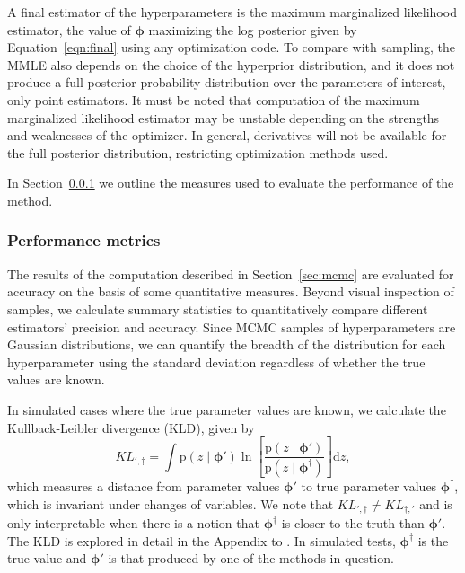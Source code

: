 \documentclass[iop]{emulateapj}
\newcommand{\Sect}[1]{Section~\ref{#1}}
\newcommand{\Eq}[1]{Equation~\ref{#1}}
\newcommand{\pr}[1]{\ensuremath{\mathrm{p}(#1)}}%
\newcommand{\gvn}{\mid}%
\newcommand{\integral}[2]{\ensuremath{\int #1 \mathrm{d} #2}}
\newcommand{\bvec}[1]{\ensuremath{\boldsymbol{#1}}}%
\newcommand{\ndphi}{\bvec{\phi}}
\begin{document}
A final estimator of the hyperparameters is the maximum marginalized likelihood estimator, the value of $\ndphi$ maximizing the log posterior given by \Eq{eqn:final} using any optimization code.  
To compare with sampling, the MMLE also depends on the choice of the hyperprior distribution, and it does not produce a full posterior probability distribution over the parameters of interest, only point estimators.  
It must be noted that computation of the maximum marginalized likelihood estimator may be unstable depending on the strengths and weaknesses of the optimizer.  
In general, derivatives will not be available for the full posterior distribution, restricting optimization methods used.

In \Sect{sec:diag} we outline the measures used to evaluate the performance of the method.

\subsubsection{Performance metrics}
\label{sec:diag}

The results of the computation described in \Sect{sec:mcmc} are evaluated for accuracy on the basis of some quantitative measures.  
Beyond visual inspection of samples, we calculate summary statistics to quantitatively compare different estimators' precision and accuracy.  
Since MCMC samples of hyperparameters are Gaussian distributions, we can quantify the breadth of the distribution for each hyperparameter using the standard deviation regardless of whether the true values are known.  

In simulated cases where the true parameter values are known, we calculate the Kullback-Leibler divergence (KLD), given by 
\begin{equation}
\label{eqn:kl}
KL_{',\ddagger} = \integral{\pr{z \gvn \ndphi'} \ln \left[ \frac{\pr{z \gvn \ndphi'}}{\pr{z \gvn \ndphi^{\dagger}}} \right]}{z} ,
\end{equation}
which measures a distance from parameter values $\ndphi'$ to true parameter values $\ndphi^{\dagger}$, which is invariant under changes of variables.  
We note that $KL_{',\dagger} \neq KL_{\dagger,'}$ and is only interpretable when there is a notion that $\ndphi^{\dagger}$ is closer to the truth than $\ndphi'$.
The KLD is explored in detail in the Appendix to \citet{malz_approximating_2018}.
In simulated tests, $\ndphi^{\dagger}$ is the true value and $\ndphi'$ is that produced by one of the methods in question.
\end{document}
